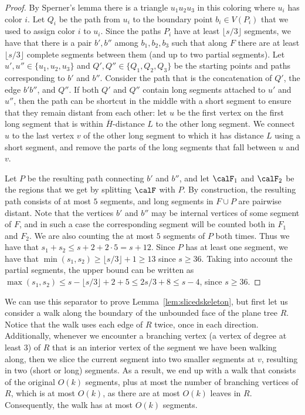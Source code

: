 \begin{proof}
By Sperner's lemma there is a triangle $u_1u_2u_3$ in this coloring where $u_i$ has color $i$. Let $Q_i$ be the path from $u_i$ to the boundary point $b_i\in V(P_i)$ that we used to assign color $i$ to $u_i$. Since the paths $P_i$ have at least $\lfloor s/3 \rfloor$ segments, we have that there is a pair $b',b''$ among $b_1,b_2,b_3$ such that  along $F$ there are at least $\lfloor s/3 \rfloor$ complete segments between them (and up to two partial segments). Let $u',u''\in \{u_1,u_2,u_3\}$ and $Q',Q''\in \{Q_1,Q_2,Q_3\}$ be the starting points and paths corresponding to $b'$ and $b''$. Consider the path that is the concatenation of $Q'$, the edge $b'b''$, and $Q''$. If both $Q'$ and $Q''$ contain long segments attached to $u'$ and $u''$, then the path can be shortcut in the middle with a short segment to ensure that they remain distant from each other: let $u$ be the first vertex on the first long segment that is within $\bar{H}$-distance $L$ to the other long segment. We connect $u$ to the last vertex $v$ of the other long segment to which it has distance $L$ using a short segment, and remove the parts of the long segments that fall between $u$ and $v$.

Let $P$ be the resulting path connecting $b'$ and $b''$, and let $\calF_1$ and $\calF_2$ be the regions that we get by splitting $\calF$ with $P$. By construction, the resulting path consists of at most $5$ segments, and long segments in $F\cup P$ are pairwise distant. Note that the vertices $b'$ and $b''$ may be internal vertices of some segment of $F$, and in such a case the corresponding segment will be counted both in $F_1$ and $F_2$. We are also counting the at most $5$ segments of $P$ both times. Thus we have that $s_1+s_2\leq s+2+2\cdot 5 = s+12$. Since $P$ has at least one segment, we have that $\min(s_1,s_2)\geq \lfloor s/3 \rfloor + 1\geq 13$ since $s\geq 36$. Taking into account the partial segments, the upper bound can be written as $\max(s_1,s_2)\leq s-\lfloor s/3 \rfloor + 2 + 5 \leq 2s/3 + 8\leq s-4$, since $s\geq 36$.
\end{proof}

We can use this separator to prove Lemma~\ref{lem:slicedskeleton}, but first let us consider a walk along the boundary of the unbounded face of the plane tree $R$. Notice that the walk uses each edge of $R$ twice, once in each direction. Additionally, whenever we encounter a branching vertex (a vertex of degree at least $3$) of $R$ that is an interior vertex of the segment we have been walking along, then we slice the current segment into two smaller segments at $v$, resulting in two (short or long) segments. As a result, we end up with a walk that consists of the original $O(k)$ segments, plus at most the number of branching vertices of $R$, which is at most $O(k)$, as there are at most $O(k)$ leaves in $R$. Consequently, the walk has at most $O(k)$ segments.

